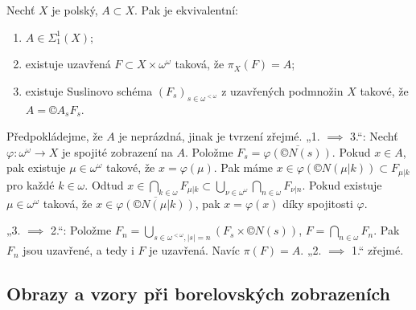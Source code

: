 \documentclass[12pt]{article}					%
\begin{document}
\begin{veta}
	Nechť $X$ je polský, $A \subset X$. Pak je ekvivalentní:
	\begin{enumerate}
		\item $A \in Σ_1^1(X)$;
		\item existuje uzavřená $F \subset X \times ω^ω$ taková, že $π_X(F) = A$;
		\item existuje Suslinovo schéma $(F_s)_{s \in ω^{<ω}}$ z uzavřených podmnožin $X$ takové, že $A = ©A_s F_s$.
	\end{enumerate}

	\begin{dukazin}
		Předpokládejme, že $A$ je neprázdná, jinak je tvrzení zřejmé. „1. $\implies$ 3.“: Nechť $φ: ω^ω \rightarrow X$ je spojité zobrazení na $A$. Položme $F_s = \overline{φ(©N(s))}$. Pokud $x \in A$, pak existuje $μ \in ω^ω$ takové, že $x = φ(μ)$. Pak máme $x \in φ(©N(μ|k)) \subset F_{μ|k}$ pro každé $k \in ω$. Odtud $x \in \bigcap_{k \in ω} F_{μ|k} \subset \bigcup_{ν \in ω^ω} \bigcap_{n \in ω} F_{ν|n}$. Pokud existuje $μ \in ω^ω$ taková, že $x \in \overline{φ(©N(μ|k))}$, pak $x = φ(x)$ díky spojitosti $φ$.

		„3. $\implies$ 2.“: Položme $F_n = \bigcup_{s \in ω^{<ω}, |s| = n} (F_s \times ©N(s))$, $F = \bigcap_{n \in ω}F_n$. Pak $F_n$ jsou uzavřené, a tedy i $F$ je uzavřená. Navíc $π(F) = A$. „2. $\implies$ 1.“ zřejmé.
	\end{dukazin}
\end{veta}

\subsection{Obrazy a vzory při borelovských zobrazeních}
\end{document}
